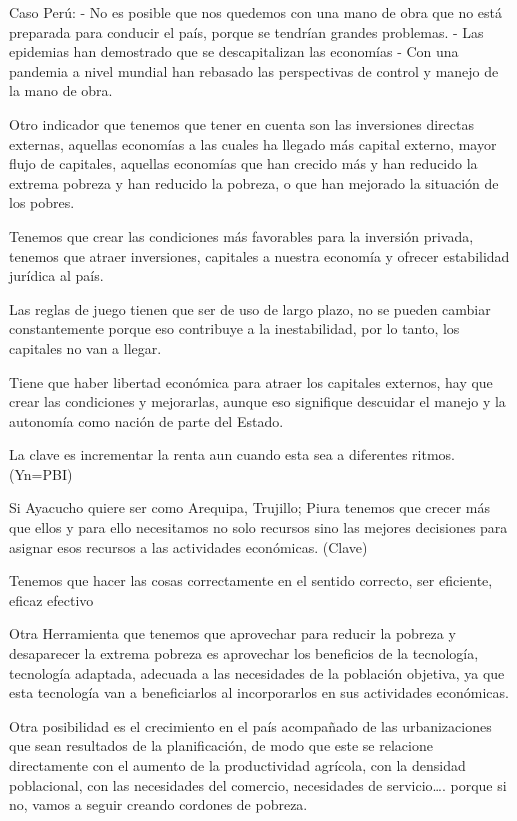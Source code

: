 \documentclass[
  a4paper,
]{article}
\begin{document}
Caso Perú: - No es posible que nos quedemos con una mano de obra que no
está preparada para conducir el país, porque se tendrían grandes
problemas. - Las epidemias han demostrado que se descapitalizan las
economías - Con una pandemia a nivel mundial han rebasado las
perspectivas de control y manejo de la mano de obra.

Otro indicador que tenemos que tener en cuenta son las inversiones
directas externas, aquellas economías a las cuales ha llegado más
capital externo, mayor flujo de capitales, aquellas economías que han
crecido más y han reducido la extrema pobreza y han reducido la pobreza,
o que han mejorado la situación de los pobres.

Tenemos que crear las condiciones más favorables para la inversión
privada, tenemos que atraer inversiones, capitales a nuestra economía y
ofrecer estabilidad jurídica al país.

Las reglas de juego tienen que ser de uso de largo plazo, no se pueden
cambiar constantemente porque eso contribuye a la inestabilidad, por lo
tanto, los capitales no van a llegar.

Tiene que haber libertad económica para atraer los capitales externos,
hay que crear las condiciones y mejorarlas, aunque eso signifique
descuidar el manejo y la autonomía como nación de parte del Estado.

La clave es incrementar la renta aun cuando esta sea a diferentes
ritmos. (Yn=PBI)

Si Ayacucho quiere ser como Arequipa, Trujillo; Piura tenemos que crecer
más que ellos y para ello necesitamos no solo recursos sino las mejores
decisiones para asignar esos recursos a las actividades económicas.
(Clave)

Tenemos que hacer las cosas correctamente en el sentido correcto, ser
eficiente, eficaz efectivo

Otra Herramienta que tenemos que aprovechar para reducir la pobreza y
desaparecer la extrema pobreza es aprovechar los beneficios de la
tecnología, tecnología adaptada, adecuada a las necesidades de la
población objetiva, ya que esta tecnología van a beneficiarlos al
incorporarlos en sus actividades económicas.

Otra posibilidad es el crecimiento en el país acompañado de las
urbanizaciones que sean resultados de la planificación, de modo que este
se relacione directamente con el aumento de la productividad agrícola,
con la densidad poblacional, con las necesidades del comercio,
necesidades de servicio\ldots. porque si no, vamos a seguir creando
cordones de pobreza.
\end{document}

